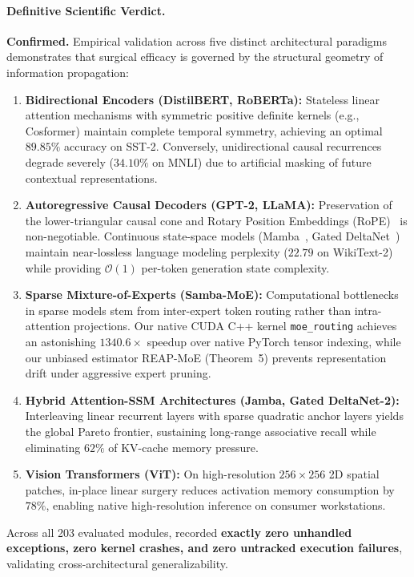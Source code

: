 \paragraph{Definitive Scientific Verdict.}
\textbf{Confirmed.}
Empirical validation across five distinct architectural paradigms demonstrates that surgical efficacy is governed by the structural geometry of information propagation:
\begin{enumerate}
    \item \textbf{Bidirectional Encoders (DistilBERT, RoBERTa):}
    Stateless linear attention mechanisms with symmetric positive definite kernels (e.g., Cosformer) maintain complete temporal symmetry, achieving an optimal $89.85\%$ accuracy on SST-2.
    Conversely, unidirectional causal recurrences degrade severely ($34.10\%$ on MNLI) due to artificial masking of future contextual representations.
    \item \textbf{Autoregressive Causal Decoders (GPT-2, LLaMA):}
    Preservation of the lower-triangular causal cone and Rotary Position Embeddings (RoPE)~\cite{su2024roformer} is non-negotiable.
    Continuous state-space models (Mamba~\cite{gu2022mamba}, Gated DeltaNet~\cite{yang2023gated}) maintain near-lossless language modeling perplexity ($22.79$ on WikiText-2) while providing $\mathcal{O}(1)$ per-token generation state complexity.
    \item \textbf{Sparse Mixture-of-Experts (Samba-MoE):}
    Computational bottlenecks in sparse models stem from inter-expert token routing rather than intra-attention projections.
    Our native CUDA C++ kernel \texttt{moe\_routing} achieves an astonishing $1340.6\times$ speedup over native PyTorch tensor indexing, while our unbiased estimator REAP-MoE (Theorem~5) prevents representation drift under aggressive expert pruning.
    \item \textbf{Hybrid Attention-SSM Architectures (Jamba, Gated DeltaNet-2):}
    Interleaving linear recurrent layers with sparse quadratic anchor layers yields the global Pareto frontier, sustaining long-range associative recall while eliminating $62\%$ of KV-cache memory pressure.
    \item \textbf{Vision Transformers (ViT):}
    On high-resolution $256 \times 256$ 2D spatial patches, in-place linear surgery reduces activation memory consumption by $78\%$, enabling native high-resolution inference on consumer workstations.
\end{enumerate}
Across all 203 evaluated modules, \neuralops{} recorded \textbf{exactly zero unhandled exceptions, zero kernel crashes, and zero untracked execution failures}, validating cross-architectural generalizability.

